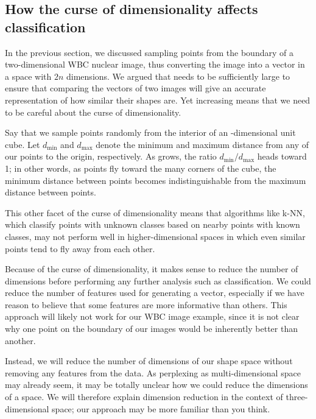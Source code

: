 \FloatBarrier
{}
\subsection{How the curse of dimensionality affects classification}

In the previous section, we discussed sampling  points from the boundary of a two-dimensional WBC nuclear image, thus converting the image into a vector in a space with $2n$ dimensions. We argued that  needs to be sufficiently large to ensure that comparing the vectors of two images will give an accurate representation of how similar their shapes are. Yet increasing  means that we need to be careful about the curse of dimensionality.

Say that we sample  points randomly from the interior of an -dimensional unit cube. Let $d_{\text{min}}$ and $d_{\text{max}}$ denote the minimum and maximum distance from any of our points to the origin, respectively. As  grows, the ratio $d_{\text{min}}/d_{\text{max}}$ heads toward 1; in other words, as points fly toward the many corners of the cube, the minimum distance between points becomes indistinguishable from the maximum distance between points.

This other facet of the curse of dimensionality means that algorithms like k-NN, which classify points with unknown classes based on nearby points with known classes, may not perform well in higher-dimensional spaces in which even similar points tend to fly away from each other.

Because of the curse of dimensionality, it makes sense to reduce the number of dimensions before performing any further analysis such as classification. We could reduce the number of features used for generating a vector, especially if we have reason to believe that some features are more informative than others. This approach will likely not work for our WBC image example, since it is not clear why one point on the boundary of our images would be inherently better than another.

Instead, we will reduce the number of dimensions of our shape space without removing any features from the data. As perplexing as multi-dimensional space may already seem, it may be totally unclear how we could reduce the dimensions of a space. We will therefore explain dimension reduction in the context of three-dimensional space; our approach may be more familiar than you think.

